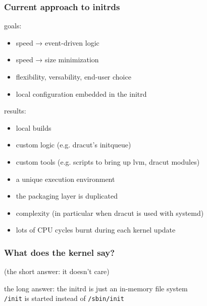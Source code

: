\documentclass[]{beamer}
\newcommand\pp{}
\begin{document}
\begin{frame}
  \frametitle{Current approach to initrds}

  \pp
  goals:

  \begin{itemize}
  \item speed → event-driven logic
  \item speed → size minimization
  \item flexibility, versability, end-user choice
  \item local configuration embedded in the initrd
  \end{itemize}

  \pp
  results:

  \begin{itemize}
  \item local builds
  \pp

  \item custom logic (e.g. dracut's initqueue)
  \pp

  \item custom tools (e.g. scripts to bring up lvm, dracut modules)
  \pp

  \item a unique execution environment
  \pp

  \item the packaging layer is duplicated
  \pp

  \item complexity (in particular when dracut is used with systemd)
  \pp

  \item lots of CPU cycles burnt during each kernel update
  \end{itemize}
\end{frame}

\begin{frame}
  \frametitle{What does the kernel say?}

  \pp
  (the short answer: it doesn't care)

  \hfill

  \pp
  the long answer:
  the initrd is just an in-memory file system\\
  \texttt{/init} is started instead of \texttt{/sbin/init}
\end{frame}
\end{document}
